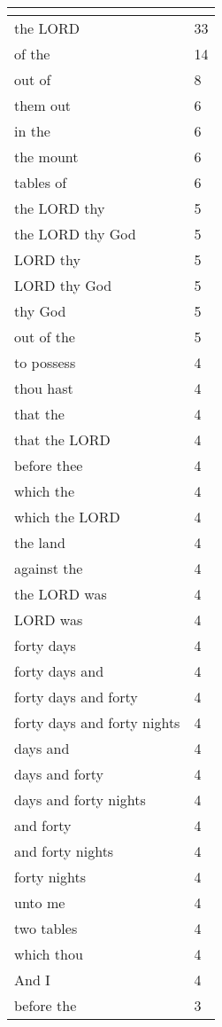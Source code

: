 \begin{center}
\begin{longtable}{|p{3.0in}|p{0.5in}|}
\hline \multicolumn{2}{c}{{ }} \\ \hline
\endfoot 
the LORD & 33\\ \hline 
of the & 14\\ \hline 
out of & 8\\ \hline 
them out & 6\\ \hline 
in the & 6\\ \hline 
the mount & 6\\ \hline 
tables of & 6\\ \hline 
the LORD thy & 5\\ \hline 
the LORD thy God & 5\\ \hline 
LORD thy & 5\\ \hline 
LORD thy God & 5\\ \hline 
thy God & 5\\ \hline 
out of the & 5\\ \hline 
to possess & 4\\ \hline 
thou hast & 4\\ \hline 
that the & 4\\ \hline 
that the LORD & 4\\ \hline 
before thee & 4\\ \hline 
which the & 4\\ \hline 
which the LORD & 4\\ \hline 
the land & 4\\ \hline 
against the & 4\\ \hline 
the LORD was & 4\\ \hline 
LORD was & 4\\ \hline 
forty days & 4\\ \hline 
forty days and & 4\\ \hline 
forty days and forty & 4\\ \hline 
forty days and forty nights & 4\\ \hline 
days and & 4\\ \hline 
days and forty & 4\\ \hline 
days and forty nights & 4\\ \hline 
and forty & 4\\ \hline 
and forty nights & 4\\ \hline 
forty nights & 4\\ \hline 
unto me & 4\\ \hline 
two tables & 4\\ \hline 
which thou & 4\\ \hline 
And I & 4\\ \hline 
before the & 3\\ \hline 

\end{longtable}
\end{center}
